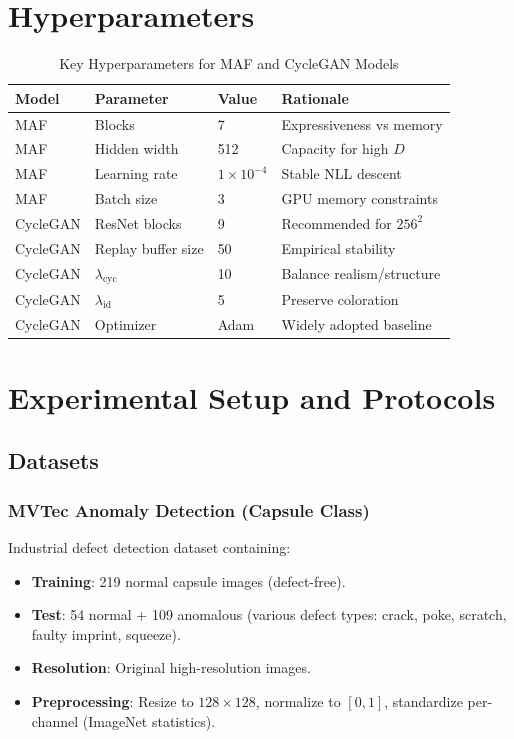\documentclass[conference]{IEEEtran}
\begin{document}
\section{Hyperparameters}
\begin{table}[h!]
 \centering
 \caption{Key Hyperparameters for MAF and CycleGAN Models}
 \label{tab:hyperparams}
 \begin{tabular}{@{}l l l l@{}}
 \toprule
 \textbf{Model} & \textbf{Parameter} & \textbf{Value} & \textbf{Rationale} \\
 \midrule
 MAF & Blocks & 7 & Expressiveness vs memory \\
 MAF & Hidden width & 512 & Capacity for high $D$ \\
 MAF & Learning rate & $1\times10^{-4}$ & Stable NLL descent \\
 MAF & Batch size & 3 & GPU memory constraints \\
 CycleGAN & ResNet blocks & 9 & Recommended for $256^2$ \\
 CycleGAN & Replay buffer size & 50 & Empirical stability \\
 CycleGAN & $\lambda_{\text{cyc}}$ & 10 & Balance realism/structure \\
 CycleGAN & $\lambda_{\text{id}}$ & 5 & Preserve coloration \\
 CycleGAN & Optimizer & Adam & Widely adopted baseline \\
 \bottomrule
 \end{tabular}
\end{table}

\section{Experimental Setup and Protocols}
\subsection{Datasets}
\subsubsection{MVTec Anomaly Detection (Capsule Class)}
Industrial defect detection dataset containing:
\begin{itemize}
\item \textbf{Training}: 219 normal capsule images (defect-free).
\item \textbf{Test}: 54 normal + 109 anomalous (various defect types: crack, poke, scratch, faulty imprint, squeeze).
\item \textbf{Resolution}: Original high-resolution images.
\item \textbf{Preprocessing}: Resize to $128 \times 128$, normalize to $[0,1]$, standardize per-channel (ImageNet statistics).
\end{itemize}
\end{document}

